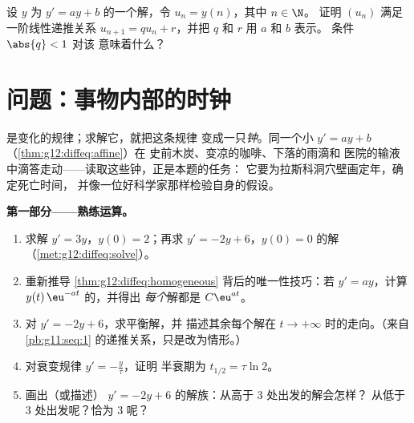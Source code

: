 \begin{exercise}[$\star\star\star$]\label{exo:g12:diffeq:9}
设 $y$ 为 $y' = ay + b$ 的一个解，令 $u_n = y(n)$，其中 $n \in \N$。
证明 $(u_n)$ 满足一阶线性递推关系
$u_{n+1} = q u_n + r$，并把 $q$ 和 $r$ 用 $a$ 和 $b$ 表示。
条件 $\abs{q} < 1$ 对该
意味着什么？
\end{exercise}

\section{问题：事物内部的时钟}

\begin{problem}
\label{pb:g12:diffeq:1}
是变化的规律；求解它，就把这条规律
变成一只\emph{钟}。同一个小
$y' = ay + b$（\cref{thm:g12:diffeq:affine}）在
史前木炭、变凉的咖啡、下落的雨滴和
医院的输液中滴答走动——读取这些钟，正是本题的任务：
它要为拉斯科洞穴壁画定年，确定死亡时间，
并像一位好科学家那样检验自身的假设。

\medskip
\noindent\textbf{第一部分——熟练运算。}
\begin{enumerate}
  \item 求解 $y' = 3y$，$y(0) = 2$；再求
        $y' = -2y + 6$，$y(0) = 0$ 的解
        （\cref{met:g12:diffeq:solve}）。
  \item 重新推导
        \cref{thm:g12:diffeq:homogeneous} 背后的唯一性技巧：若 $y' = ay$，计算
        $y(t)\,\eu^{-at}$ 的，并得出
        \emph{每个}解都是 $C\eu^{at}$。
  \item 对 $y' = -2y + 6$，求平衡解，并
        描述其余每个解在
        $t \to +\infty$ 时的走向。（来自
        \cref{pb:g11:seq:1} 的递推关系，只是改为情形。）
  \item 对衰变规律 $y' = -\frac{y}{\tau}$，证明
        半衰期为 $t_{1/2} = \tau \ln 2$。
  \item 画出（或描述）
        $y' = -2y + 6$ 的解族：从高于 $3$ 处出发的解会怎样？
        从低于 $3$ 处出发呢？恰为 $3$ 呢？
\end{enumerate}


\end{problem}
